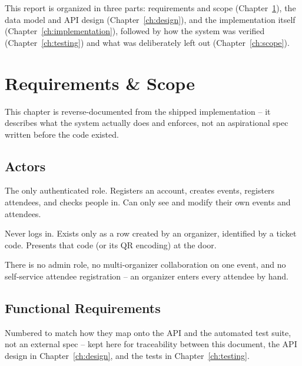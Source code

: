 ﻿\documentclass[11pt,letterpaper]{report}
\begin{document}
This report is organized in three parts: requirements and scope
(Chapter~\ref{ch:requirements}), the data model and API design
(Chapter~\ref{ch:design}), and the implementation itself
(Chapter~\ref{ch:implementation}), followed by how the system was
verified (Chapter~\ref{ch:testing}) and what was deliberately left out
(Chapter~\ref{ch:scope}).

\chapter{Requirements \& Scope}
\label{ch:requirements}

This chapter is reverse-documented from the shipped implementation --
it describes what the system actually does and enforces, not an
aspirational spec written before the code existed.

\section{Actors}

\begin{description}[leftmargin=2em]
  \item[Organizer] The only authenticated role. Registers an account,
    creates events, registers attendees, and checks people in. Can
    only see and modify their own events and attendees.
  \item[Attendee] Never logs in. Exists only as a row created by an
    organizer, identified by a ticket code. Presents that code (or its
    QR encoding) at the door.
\end{description}

There is no admin role, no multi-organizer collaboration on one event,
and no self-service attendee registration -- an organizer enters every
attendee by hand.

\section{Functional Requirements}

Numbered to match how they map onto the API and the automated test
suite, not an external spec -- kept here for traceability between this
document, the API design in Chapter~\ref{ch:design}, and the tests in
Chapter~\ref{ch:testing}.
\end{document}
